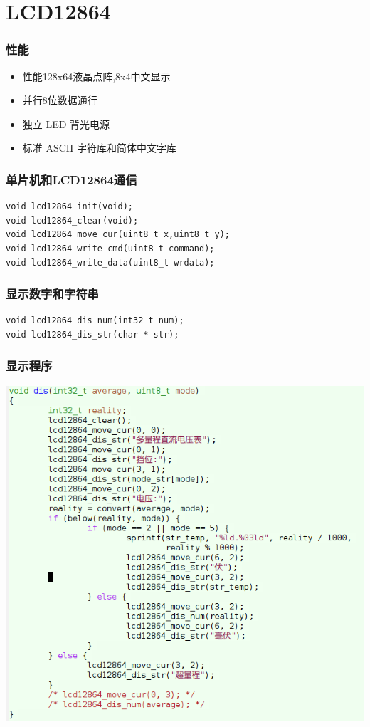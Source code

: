 \documentclass[bigger]{beamer}
\begin{document}
\section{LCD12864}
\label{sec-4}
\begin{frame}
\frametitle{性能}
\label{sec-4-1}

\begin{itemize}
\item 性能128x64液晶点阵,8x4中文显示
\item 并行8位数据通行
\item 独立 LED 背光电源
\item 标准 ASCII 字符库和简体中文字库
\end{itemize}
\end{frame}
\begin{frame}[fragile]
\frametitle{单片机和LCD12864通信}
\label{sec-4-2}

\begin{verbatim}
void lcd12864_init(void);
void lcd12864_clear(void);
void lcd12864_move_cur(uint8_t x,uint8_t y);
void lcd12864_write_cmd(uint8_t command);
void lcd12864_write_data(uint8_t wrdata);
\end{verbatim}
\end{frame}
\begin{frame}[fragile]
\frametitle{显示数字和字符串}
\label{sec-4-3}

\begin{verbatim}
void lcd12864_dis_num(int32_t num);
void lcd12864_dis_str(char * str);
\end{verbatim}
\end{frame}
\begin{frame}
\frametitle{显示程序}
\label{sec-4-4}

\includegraphics[width=.9\linewidth]{dis.png}

   
\end{frame}
\end{document}
